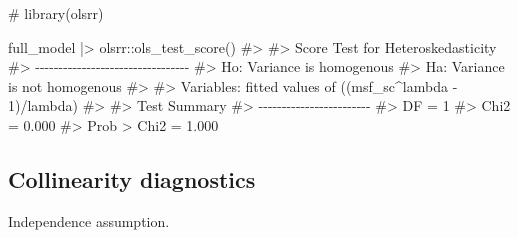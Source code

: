 \documentclass[
  12pt,
  a4paper,
  oneside]{tesesusp}
\newenvironment{Shaded}{\begin{snugshade}}{\end{snugshade}}
\newcommand{\CommentTok}[1]{\textcolor[rgb]{0.37,0.37,0.37}{#1}}
\newcommand{\FunctionTok}[1]{\textcolor[rgb]{0.28,0.35,0.67}{#1}}
\newcommand{\NormalTok}[1]{\textcolor[rgb]{0.00,0.23,0.31}{#1}}
\newcommand{\SpecialCharTok}[1]{\textcolor[rgb]{0.37,0.37,0.37}{#1}}
\begin{document}
\begin{Shaded}
\begin{Highlighting}[numbers=left,,]
\CommentTok{\# library(olsrr)}

\NormalTok{full\_model }\SpecialCharTok{|\textgreater{}}\NormalTok{ olsrr}\SpecialCharTok{::}\FunctionTok{ols\_test\_score}\NormalTok{()}
\CommentTok{\#\textgreater{} }
\CommentTok{\#\textgreater{}  Score Test for Heteroskedasticity}
\CommentTok{\#\textgreater{}  {-}{-}{-}{-}{-}{-}{-}{-}{-}{-}{-}{-}{-}{-}{-}{-}{-}{-}{-}{-}{-}{-}{-}{-}{-}{-}{-}{-}{-}{-}{-}{-}{-}}
\CommentTok{\#\textgreater{}  Ho: Variance is homogenous}
\CommentTok{\#\textgreater{}  Ha: Variance is not homogenous}
\CommentTok{\#\textgreater{} }
\CommentTok{\#\textgreater{}  Variables: fitted values of ((msf\_sc\^{}lambda {-} 1)/lambda) }
\CommentTok{\#\textgreater{} }
\CommentTok{\#\textgreater{}       Test Summary       }
\CommentTok{\#\textgreater{}  {-}{-}{-}{-}{-}{-}{-}{-}{-}{-}{-}{-}{-}{-}{-}{-}{-}{-}{-}{-}{-}{-}{-}{-}}
\CommentTok{\#\textgreater{}  DF            =    1 }
\CommentTok{\#\textgreater{}  Chi2          =    0.000 }
\CommentTok{\#\textgreater{}  Prob \textgreater{} Chi2   =    1.000}
\end{Highlighting}
\end{Shaded}

\hypertarget{collinearity-diagnostics-1}{%
\subsection{Collinearity diagnostics}\label{collinearity-diagnostics-1}}

Independence assumption.
\end{document}
